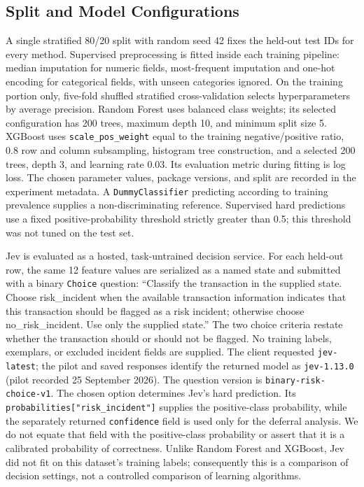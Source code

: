 \documentclass{llncs}
\begin{document}
\subsection{Split and Model Configurations}

A single stratified 80/20 split with random seed 42 fixes the held-out test IDs for every method. Supervised preprocessing is fitted inside each training pipeline: median imputation for numeric fields, most-frequent imputation and one-hot encoding for categorical fields, with unseen categories ignored. On the training portion only, five-fold shuffled stratified cross-validation selects hyperparameters by average precision. Random Forest uses balanced class weights; its selected configuration has 200 trees, maximum depth 10, and minimum split size 5. XGBoost uses \texttt{scale\_pos\_weight} equal to the training negative/positive ratio, 0.8 row and column subsampling, histogram tree construction, and a selected 200 trees, depth 3, and learning rate 0.03. Its evaluation metric during fitting is log loss. The chosen parameter values, package versions, and split are recorded in the experiment metadata. A \texttt{DummyClassifier} predicting according to training prevalence supplies a non-discriminating reference. Supervised hard predictions use a fixed positive-probability threshold strictly greater than 0.5; this threshold was not tuned on the test set.

Jev is evaluated as a hosted, task-untrained decision service. For each held-out row, the same 12 feature values are serialized as a named state and submitted with a binary \texttt{Choice} question: ``Classify the transaction in the supplied state. Choose risk\_incident when the available transaction information indicates that this transaction should be flagged as a risk incident; otherwise choose no\_risk\_incident. Use only the supplied state.'' The two choice criteria restate whether the transaction should or should not be flagged. No training labels, exemplars, or excluded incident fields are supplied. The client requested \texttt{jev-latest}; the pilot and saved responses identify the returned model as \texttt{jev-1.13.0} (pilot recorded 25 September 2026). The question version is \texttt{binary-risk-choice-v1}. The chosen option determines Jev's hard prediction. Its \texttt{probabilities["risk\_incident"]} supplies the positive-class probability, while the separately returned \texttt{confidence} field is used only for the deferral analysis. We do not equate that field with the positive-class probability or assert that it is a calibrated probability of correctness. Unlike Random Forest and XGBoost, Jev did not fit on this dataset's training labels; consequently this is a comparison of decision settings, not a controlled comparison of learning algorithms.
\end{document}
